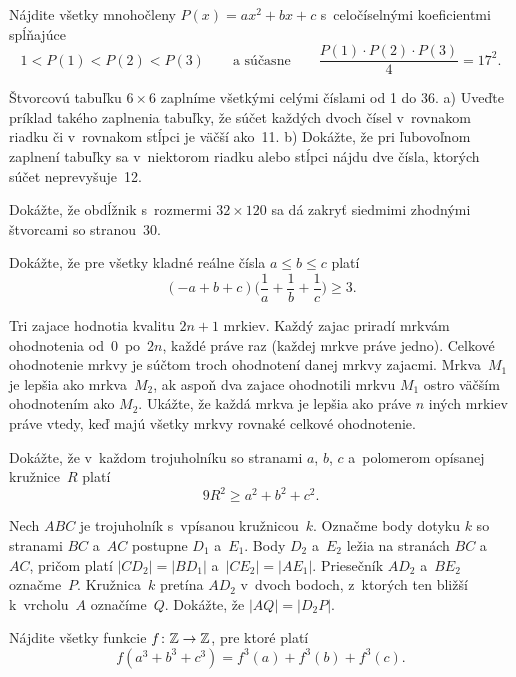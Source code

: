 {%
Nájdite všetky mnohočleny $P(x)=ax^2+bx+c$ s~celočíselnými koeficientmi
spĺňajúce
$$
1<P(1)<P(2)<P(3)\qquad \text{a~súčasne}\qquad \frac{P(1)\cdot P(2)\cdot P(3)}4=17^2.
$$
}

{%
Štvorcovú tabuľku $6\times 6$ zaplníme všetkými celými číslami od
1 do 36.
\ite a) Uveďte príklad takého zaplnenia tabuľky, že súčet každých
dvoch čísel v~rovnakom riadku či v~rovnakom stĺpci je väčší ako~11.
\ite b) Dokážte, že pri ľubovoľnom zaplnení tabuľky sa v~niektorom riadku alebo stĺpci nájdu
dve čísla, ktorých súčet neprevyšuje~12.\endgraf}

{%
Dokážte, že obdĺžnik s~rozmermi $32\times120$ sa dá zakryť siedmimi zhodnými štvorcami so stranou~30.}

{%
Dokážte, že pre všetky kladné reálne čísla $ a\le b\le c$ platí
$$
(-a+b+c)\Big(\frac{1}{a}+\frac{1}{b}+\frac{1}{c}\Big)\geq3.
$$
}

{%
Tri zajace hodnotia kvalitu $2n+1$ mrkiev. Každý zajac priradí mrkvám ohodnotenia
od~$0$~po~$2n$, každé práve raz (každej mrkve práve jedno).
Celkové ohodnotenie mrkvy je súčtom troch ohodnotení danej mrkvy zajacmi.
Mrkva~$M_1$ je lepšia ako mrkva~$M_2$, ak aspoň dva zajace ohodnotili mrkvu
$M_1$ ostro väčším ohodnotením ako $M_2$.
Ukážte, že každá mrkva je lepšia ako práve $n$ iných mrkiev práve vtedy,
keď majú všetky mrkvy rovnaké celkové ohodnotenie.}

{%
Dokážte, že v~každom trojuholníku so stranami $a$, $b$, $c$ a~polomerom opísanej kružnice~$R$
platí
$$9R^2 \ge a^2 + b^2 + c^2.$$}

{%
Nech $ABC$ je trojuholník s~vpísanou kružnicou~$k$.
Označme body dotyku $k$ so stranami $BC$ a~$AC$ postupne $D_1$ a~$E_1$.
Body $D_2$ a~$E_2$ ležia na stranách $BC$ a~$AC$, pričom platí
${|CD_2|=|BD_1|}$ a~${|CE_2|=|AE_1|}$. Priesečník $AD_2$ a~$BE_2$ označme~$P$.
Kružnica~$k$ pretína $AD_2$ v~dvoch bodoch, z~ktorých ten bližší k~vrcholu~$A$
označíme~$Q$. Dokážte, že $|AQ|=|D_2P|$.}

{%
Nájdite všetky funkcie $f\colon \Bbb{Z}\to\Bbb{Z}$, pre ktoré platí
$$f(a^3+b^3+c^3)=f^3(a)+f^3(b)+f^3(c).$$}

